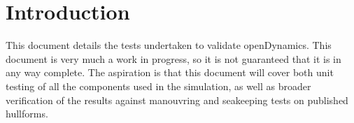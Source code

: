 \chapter{Introduction}
This document details the tests undertaken to validate openDynamics. This document is very much a work in progress, so it is not guaranteed that it is in any way complete. The aspiration is that this document will cover both unit testing of all the components used in the simulation, as well as broader verification of the results against manouvring and seakeeping tests on published hullforms.
